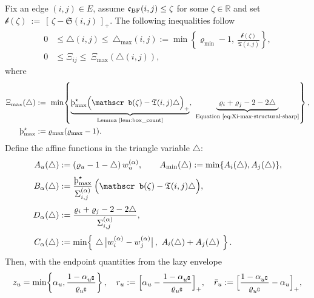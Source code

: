 \documentclass[twoside,11pt]{article}
\numberwithin{equation}{section}
\numberwithin{theorem}{section}
\numberwithin{example}{section}
\newcommand{\sho}{\textup{\text{\th}}}
\begin{document}
\begin{theorem}
\label{thm:BF-to-OR-lazy}
Fix an edge $(i,j)\in E$, assume $\mathfrak c_{\rm BF}(i,j)\le \zeta$ for some $\zeta\in\mathbb R$ and set
\(
\mathscr b(\zeta)\ :=\ [\,\zeta-\mathfrak S(i,j)\,]_+.
\)
The following inequalities follow
\begin{equation}
\label{eq:bf-budget-region}
\begin{aligned}
0 & \le \triangle(i,j) \le\ \triangle_{\max}(i,j):=\min\!\left\{\varrho_{\min}-1,\ \frac{\mathscr b(\zeta)}{\mathfrak T(i,j)}\right\},
\\
0 & \le \Xi_{ij} \le\ \Xi_{\max}\left(\triangle(i,j)\right),
\end{aligned}
\end{equation}
where
\begin{equation}
\label{eq:Xi-upper-two-sources}
\begin{aligned}
\Xi_{\max}(\triangle) & :=\ \min\!\left\{
\underbrace{\sho_{\max}^\star\Bigl(\mathscr b(\zeta)-\mathfrak T(i,j)\triangle\Bigr)_+}_{\text{\rm Lemma \ref{lem:box_count}}},
\ \underbrace{\ \varrho_i+\varrho_j-2-2\triangle\ }_{\text{\rm Equation \eqref{eq:Xi-max-structural-sharp}}}
\right\},
\\
\sho_{\max}^\star&:=\varrho_{\max}(\varrho_{\max}-1).
\end{aligned}
\end{equation}
Define the affine functions in the triangle variable $\triangle$:
\begin{align}
\label{eq:Amin}
A_u(\triangle)&:=(\varrho_u-1-\triangle)\,w^{(\alpha)}_u,\qquad
A_{\min}(\triangle):=\min\{A_i(\triangle),A_j(\triangle)\},\\[3pt]
\label{eq:Balph}
B_\alpha(\triangle)&:=\frac{\sho_{\max}^\star}{\Sigma^{(\alpha)}_{i,j}}\,\Bigl(\mathscr b(\zeta)-\mathfrak T(i,j)\triangle\Bigr),\\[3pt]
\label{eq:Dalph}
D_\alpha(\triangle)&:=\frac{\varrho_i+\varrho_j-2-2\triangle}{\Sigma^{(\alpha)}_{i,j}},\\[3pt]
\label{eq:Calph}
C_\alpha(\triangle)&:=\min\!\left\{\ \triangle\,\bigl|w^{(\alpha)}_i-w^{(\alpha)}_j\bigr|\,,\ A_i(\triangle)+A_j(\triangle)\ \right\}.
\end{align}
Then, with the endpoint quantities from the lazy envelope
\[
z_u=\min\!\left\{\alpha_u,\frac{1-\alpha_{u^\complement}}{\varrho_{u^\complement}}\right\},\quad
r_u:=\Bigl[\alpha_u-\frac{1-\alpha_{u^\complement}}{\varrho_{u^\complement}}\Bigr]_+,\quad
\bar r_u:=\Bigl[\frac{1-\alpha_{u^\complement}}{\varrho_{u^\complement}}-\alpha_u\Bigr]_+,
\]
\end{theorem}
\end{document}
